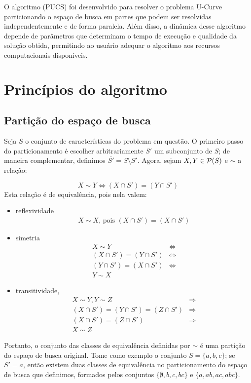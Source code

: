 O algoritmo  (PUCS) foi desenvolvido 
para resolver o problema U-Curve particionando o espaço de busca em 
partes que podem ser resolvidas independentemente e de forma paralela. 
Além disso, a dinâmica desse algoritmo depende de parâmetros que 
determinam o tempo de execução e qualidade da solução obtida, permitindo
ao usuário adequar o algoritmo aos recursos computacionais disponíveis. 

\section{Princípios do algoritmo}
 
\subsection{Partição do espaço de busca}
Seja $S$ o conjunto de características do problema em questão. O 
primeiro passo do particionamento é escolher arbitrariamente $S'$ um 
subconjunto de $S$; de maneira complementar, definimos 
$\overline{S'} = S \setminus S'$. Agora, sejam $X, Y \in \mathcal{P} (S)$
e $\sim$ a relação:

\begin{equation*}
    X \sim Y \iff (X \cap S') = (Y \cap S')
\end{equation*}
Esta relação é de equivalência, pois nela valem:

\begin{itemize}
    \item{reflexividade}
        \begin{align*} 
            X \sim X \text{, pois }
            (X \cap S') = (X \cap S')
        \end{align*} 
    \item{simetria}
        \begin{align*}
            X \sim Y  & \iff \\
            (X \cap S') = (Y \cap S') & \iff \\
            (Y \cap S') = (X \cap S') & \iff \\
            Y \sim X 
        \end{align*}
    \item{transitividade,}
        \begin{align*}
            X \sim Y, Y \sim Z & \Rightarrow \\
            (X \cap S') = (Y \cap S') = (Z \cap S') & \Rightarrow \\
            (X \cap S') = (Z \cap S') & \Rightarrow \\
            X \sim Z
        \end{align*}
\end{itemize}
Portanto, o conjunto das classes de equivalência definidas por $\sim$ é
uma partição do espaço de busca original. Tome como exemplo o conjunto
$S = \{a, b, c\}$; se $S' = {a}$, então existem duas classes de 
equivalência no particionamento do espaço de busca que definimos, 
formados pelos conjuntos $\{\emptyset, b, c, bc\}$ e $\{a, ab, ac, 
abc\}$.

